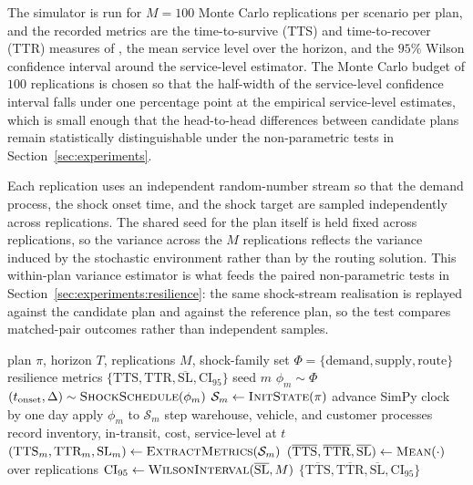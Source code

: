 \documentclass[review,preprint,authoryear,12pt]{elsarticle}
\begin{document}
The simulator is run for $M = 100$ Monte Carlo replications per
scenario per plan, and the recorded metrics are the time-to-survive
(TTS) and time-to-recover (TTR) measures of \citet{hosseini2019review},
the mean service level over the horizon, and the $95\%$ Wilson
confidence interval around the service-level estimator. The Monte
Carlo budget of $100$ replications is chosen so that the half-width
of the service-level confidence interval falls under one percentage
point at the empirical service-level estimates, which is small enough
that the head-to-head differences between candidate plans remain
statistically distinguishable under the non-parametric tests in
Section~\ref{sec:experiments}.

Each replication uses an independent random-number stream so that the
demand process, the shock onset time, and the shock target are
sampled independently across replications. The shared seed for the
plan itself is held fixed across replications, so the variance across
the $M$ replications reflects the variance induced by the stochastic
environment rather than by the routing solution. This within-plan
variance estimator is what feeds the paired non-parametric tests in
Section~\ref{sec:experiments:resilience}: the same shock-stream
realisation is replayed against the candidate plan and against the
reference plan, so the test compares matched-pair outcomes rather
than independent samples.

\begin{algorithm}[H]
\caption{Discrete-event simulation with shock models and Monte Carlo replication}
\label{alg:des}
\begin{algorithmic}[1]
\Require plan $\pi$, horizon $T$, replications $M$, shock-family set $\Phi = \{\text{demand}, \text{supply}, \text{route}\}$
\Ensure resilience metrics $\{\text{TTS}, \text{TTR}, \overline{\text{SL}}, \text{CI}_{95}\}$
  \State seed $m$ 
  \State $\phi_m \sim \Phi$ 
  \State $(t_{\text{onset}}, \Delta) \sim \textsc{ShockSchedule}(\phi_m)$
  \State $\mathcal{S}_m \gets \textsc{InitState}(\pi)$
    \State advance SimPy clock by one day
      \State apply $\phi_m$ to $\mathcal{S}_m$ 
    \EndIf
    \State step warehouse, vehicle, and customer processes
    \State record inventory, in-transit, cost, service-level at $t$
  \EndFor
  \State $(\text{TTS}_m, \text{TTR}_m, \text{SL}_m) \gets \textsc{ExtractMetrics}(\mathcal{S}_m)$
\EndFor
\State $(\overline{\text{TTS}}, \overline{\text{TTR}}, \overline{\text{SL}}) \gets \textsc{Mean}(\cdot)$ over replications
\State $\text{CI}_{95} \gets \textsc{WilsonInterval}(\overline{\text{SL}}, M)$
\State \Return $\{\overline{\text{TTS}}, \overline{\text{TTR}}, \overline{\text{SL}}, \text{CI}_{95}\}$
\end{algorithmic}
\end{algorithm}
\end{document}
